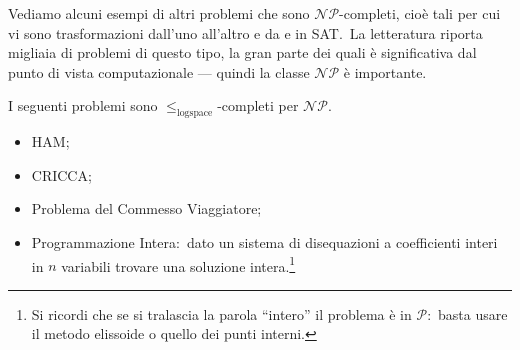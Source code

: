 \noindent Vediamo alcuni esempi di altri problemi che sono $\mathcal{NP}$-completi, cioè tali per cui vi sono trasformazioni dall'uno all'altro e da e in {\footnotesize SAT}.\
La letteratura riporta migliaia di problemi di questo tipo, la gran parte dei quali è significativa dal punto di vista computazionale --- quindi la classe $\mathcal{NP}$ è importante.

\begin{example}
    I seguenti problemi sono $\leqslant_{\mathrm{logspace}}$-completi per $\mathcal{NP}$.
    \begin{itemize}
        \item {\footnotesize HAM};
        \item {\footnotesize CRICCA};
        \item Problema del Commesso Viaggiatore;
        \item Programmazione Intera:\ dato un sistema di disequazioni a coefficienti interi in $n$ variabili trovare una soluzione intera.\footnote{Si ricordi che se si tralascia la parola ``intero'' il problema è in $\mathcal{P}$:\ basta usare il metodo elissoide o quello dei punti interni.}
    \end{itemize}
\end{example}

